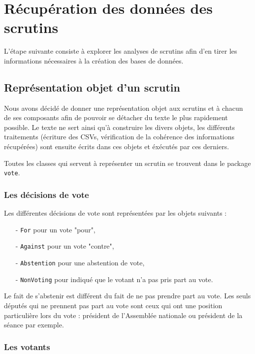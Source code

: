 \section{Récupération des données des scrutins}

L'étape suivante consiste à explorer les analyses de scrutins afin d'en tirer les informations nécessaires à la création des bases de données.

\subsection{Représentation objet d'un scrutin}

Nous avons décidé de donner une représentation objet aux scrutins et à chacun de ses composants afin de pouvoir se détacher du texte le plus rapidement possible. Le texte ne sert ainsi qu'à construire les divers objets, les différents traitements (écriture des CSVs, vérification de la cohérence des informations récupérées) sont ensuite écrits dans ces objets et éxécutés par ces derniers.

Toutes les classes qui servent à représenter un scrutin se trouvent dans le package \verb|vote|.

\subsubsection*{Les décisions de vote}

Les différentes décisions de vote sont représentées par les objets suivants :
\begin{itemize}
\item[-] \verb|For| pour un vote "pour",
\item[-] \verb|Against| pour un vote "contre",
\item[-] \verb|Abstention| pour une abstention de vote,
\item[-] \verb|NonVoting| pour indiqué que le votant n'a pas pris part au vote.
\end{itemize}

\vspace{0.3cm}
Le fait de s'abstenir est différent du fait de ne pas prendre part au vote. Les seuls députés qui ne prennent pas part au vote sont ceux qui ont une position particulière lors du vote : président de l'Assemblée nationale ou président de la séance par exemple.

\subsubsection*{Les votants}

